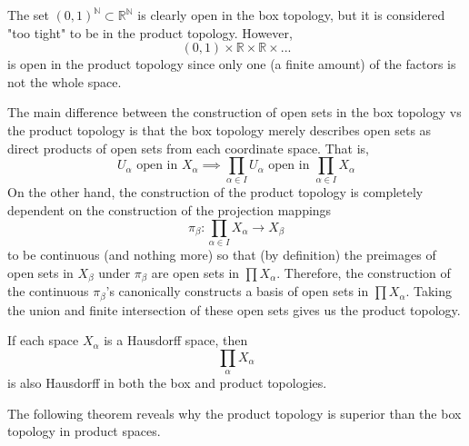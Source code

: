 \documentclass{article}
\begin{document}
    \begin{example}
    The set $(0,1)^\mathbb{N} \subset \mathbb{R}^\mathbb{N}$ is clearly open in the box topology, but it is considered "too tight" to be in the product topology. However, 
    \[(0,1) \times \mathbb{R} \times \mathbb{R} \times ... \]
    is open in the product topology since only one (a finite amount) of the factors is not the whole space. 
    \end{example}

    The main difference between the construction of open sets in the box topology vs the product topology is that the box topology merely describes open sets as direct products of open sets from each coordinate space. That is,
    \[U_\alpha \text{ open in } X_\alpha \implies \prod_{\alpha \in I} U_\alpha \text{ open in } \prod_{\alpha \in I} X_\alpha\]
    On the other hand, the construction of the product topology is completely dependent on the construction of the projection mappings 
    \[ \pi_\beta: \prod_{\alpha \in I} X_\alpha \longrightarrow X_\beta\]
    to be continuous (and nothing more) so that (by definition) the preimages of open sets in $X_\beta$ under $\pi_\beta$ are open sets in $\prod X_\alpha$. Therefore, the construction of the continuous $\pi_\beta$'s canonically constructs a basis of open sets in $\prod X_\alpha$. Taking the union and finite intersection of these open sets gives us the product topology. 

    \begin{theorem}
    If each space $X_\alpha$ is a Hausdorff space, then 
    \[\prod_{\alpha} X_\alpha\]
    is also Hausdorff in both the box and product topologies. 
    \end{theorem}

    The following theorem reveals why the product topology is superior than the box topology in product spaces. 
\end{document}

